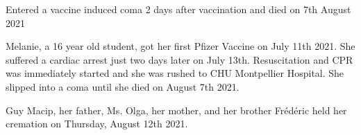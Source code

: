 Entered a vaccine induced coma 2 days after vaccination and died on 7th August
2021

Melanie, a 16 year old student, got her first Pfizer Vaccine on July 11th
2021. She suffered a cardiac arrest just two days later on July
13th. Resuscitation and CPR was immediately started and she was rushed to CHU
Montpellier Hospital. She slipped into a coma until she died on August 7th 2021.

Guy Macip, her father, Ms. Olga, her mother, and her brother Frédéric held her
cremation on Thursday, August 12th 2021.
